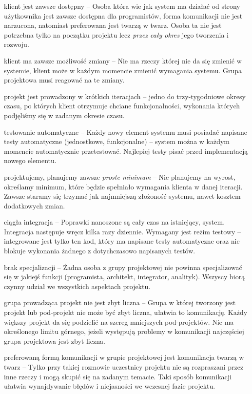 \begin{packed_item}
    \item klient jest zawsze dostępny -- Osoba która wie jak system ma działać od strony użytkownika jest zawsze dostępna dla programistów, forma komunikacji nie jest narzucona, natomiast preferowana jest twarzą w twarz. Osoba ta nie jest potrzebna tylko na początku projektu lecz \emph{przez cały okres} jego tworzenia i rozwoju.
    \item klient ma zawsze możliwość zmiany -- Nie ma rzeczy której nie da się zmienić w systemie, klient może w każdym momencie zmienić wymagania systemu. Grupa projektowa musi reagować na te zmiany.
    \item projekt jest prowadzony w krótkich iteracjach -- jedno do trzy-tygodniowe okresy czasu, po których klient otrzymuje chciane funkcjonalności, wykonania których podjęliśmy się w zadanym okresie czasu.
    \item testowanie automatyczne -- Każdy nowy element systemu musi posiadać napisane testy automatyczne (jednostkowe, funkcjonalne) -- system można w każdym momencie automatycznie przetestować. Najlepiej testy pisać przed implementacją nowego elementu.
    \item projektujemy, planujemy zawsze \emph{proste minimum} -- Nie planujemy na wyrost, określamy minimum, które będzie spełniało wymagania klienta w danej iteracji. Zawsze staramy się trzymać jak najmniejszą złożoność systemu, nawet kosztem dodatkowych zmian.
    \item ciągła integracja -- Poprawki nanoszone są cały czas na istniejący, system. Integracja następuje wręcz kilka razy dziennie. Wymagany jest reżim testowy -- integrowane jest tylko ten kod, który ma napisane testy automatyczne oraz nie blokuje wykonania żadnego z dotychczasowo napisanych testów.
    \item brak specjalizacji -- Żadna osoba z grupy projektowej nie powinna specjalizować się w jakiejś funkcji (programista, architekt, integrator, analityk). Wszyscy biorą czynny udział we wszystkich aspektach projektu.
    \item grupa prowadząca projekt nie jest zbyt liczna -- Grupa w której tworzony jest projekt lub pod-projekt nie może być zbyt liczna, ułatwia to komunikację. Każdy większy projekt da się podzielić na szereg mniejszych pod-projektów. Nie ma określonego limitu górnego, jeżeli występują problemy w komunikacji najczęściej grupa projektowa jest zbyt liczna.
    \item preferowaną formą komunikacji w grupie projektowej jest komunikacja twarzą w twarz -- Tylko przy takiej rozmowie uczestnicy projektu nie są rozpraszani przez inne rzeczy i mogą skupić się na zadanym temacie. Taki sposób komunikacji ułatwia wynajdywanie błędów i niejasności we wczesnej fazie projektu.

\end{packed_item}
